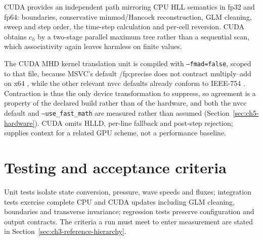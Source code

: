 CUDA provides an independent path mirroring CPU HLL semantics in fp32 and fp64:
boundaries, conservative minmod/Hancock reconstruction, GLM cleaning, sweep and
step order, the time-step calculation and per-cell reversion. CUDA obtains $c_h$
by a two-stage parallel maximum tree rather than a sequential scan, which
associativity again leaves harmless on finite values.

The CUDA MHD kernel translation unit is compiled with \texttt{--fmad=false},
scoped to that file, because MSVC's default /fp:precise does not contract
multiply--add on x64 \citep{microsoftMsvcFp2021},
while the other relevant nvcc defaults already conform to IEEE-754
\citep{whitehead_fitflorea_2011}. Contraction is thus the only device
transformation to suppress, so agreement is a property of the declared build
rather than of the hardware, and both the nvcc default and
\texttt{--use\_fast\_math} are measured rather than assumed
(Section~\ref{sec:ch5-hardware}). CUDA omits HLLD, per-line
fallback and post-step rejection; \citet{bard_dorelli_2014} supplies context for
a related GPU scheme, not a performance baseline.

\section{Testing and acceptance criteria}
\label{sec:ch2-gates}

Unit tests isolate state conversion, pressure, wave speeds and fluxes;
integration tests exercise complete CPU and CUDA updates including GLM
cleaning, boundaries and transverse invariance; regression tests preserve
configuration and output contracts. The criteria a run must meet to enter
measurement are stated in Section~\ref{sec:ch3-reference-hierarchy}.
